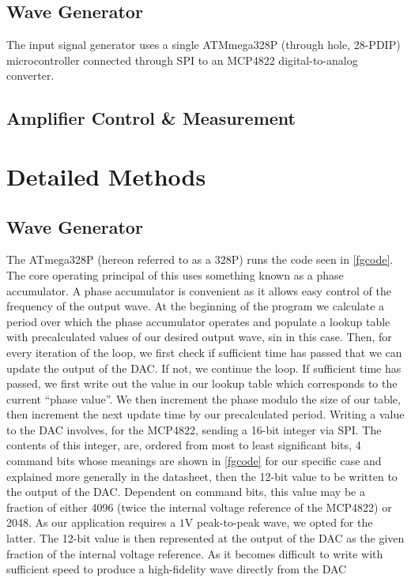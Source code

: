 \documentclass[10pt, twocolumn]{article}
\theoremstyle{definition}
\begin{document}
\subsection{Wave Generator}
The input signal generator uses a single ATMmega328P \cite{microchip:ATmega328P} (through hole, 28-PDIP) microcontroller connected through SPI
to an MCP4822\cite{microchip:MCP4822} digital-to-analog converter.
\subsection{Amplifier Control \& Measurement}
\section{Detailed Methods}
\subsection{Wave Generator}
The ATmega328P (hereon referred to as a 328P) runs the code seen in \ref{fgcode}. 
The core operating principal of this uses something known as a phase accumulator. 
A phase accumulator is convenient as it allows easy control of the frequency of the output wave.
At the beginning of the program we calculate a period over which the phase accumulator operates
and populate a lookup table with precalculated values of our desired output wave, sin in this case.
Then, for every iteration of the loop, we first check if sufficient time has passed that we
can update the output of the DAC. If not, we continue the loop. If sufficient time has passed,
we first write out the value in our lookup table which corresponds to the current ``phase value''. We
then increment the phase modulo the size of our table, then increment the next update time by our precalculated period.
Writing a value to the DAC involves, for the MCP4822, sending a 16-bit integer via SPI. 
The contents of this integer, are, ordered from most to least significant bits,
4 command bits whose meanings are shown in \ref{fgcode} for our specific case and explained more generally
in the datasheet\cite{microchip:MCP4822}, then the 12-bit value to be written to the output of the DAC. Dependent
on command bits, this value may be a fraction of either 4096 (twice the internal voltage reference of the MCP4822)
or 2048. As our application requires a $1\unit{\volt}$ peak-to-peak wave, we opted for the latter. The 12-bit value
is then represented at the output of the DAC as the given fraction of the internal voltage reference. As
it becomes difficult to write with sufficient speed to produce a high-fidelity wave directly from the DAC
\end{document}
